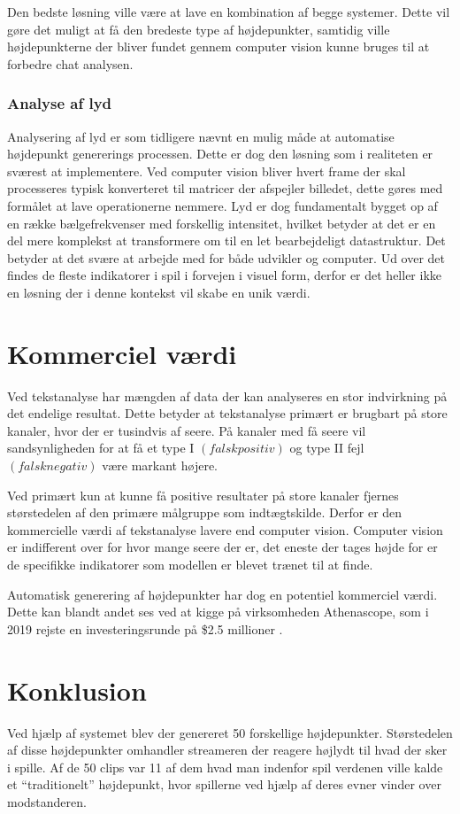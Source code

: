 \documentclass{article}
\begin{document}
Den bedste løsning ville være at lave en kombination af begge systemer. Dette vil gøre det muligt at få den bredeste type af højdepunkter, samtidig ville højdepunkterne der bliver fundet gennem computer vision kunne bruges til at forbedre chat analysen.

\subsubsection{Analyse af lyd }
Analysering af lyd er som tidligere nævnt en mulig måde at automatise højdepunkt genererings processen. Dette er dog den løsning som i realiteten er sværest at implementere. Ved computer vision bliver hvert frame der skal processeres typisk konverteret til matricer der afspejler billedet, dette gøres med formålet at lave operationerne nemmere. Lyd er dog fundamentalt bygget op af en række bælgefrekvenser med forskellig intensitet, hvilket betyder at det er en del mere komplekst at transformere om til en let bearbejdeligt datastruktur. Det betyder at det svære at arbejde med for både udvikler og computer. Ud over det findes de fleste indikatorer i spil i forvejen i visuel form, derfor er det heller ikke en løsning der i denne kontekst vil skabe en unik værdi.


\section{Kommerciel værdi }
Ved tekstanalyse har mængden af data der kan analyseres en stor indvirkning på det endelige resultat. Dette betyder at tekstanalyse primært er brugbart på store kanaler, hvor der er tusindvis af seere. På kanaler med få seere vil sandsynligheden for at få et type I \((falsk positiv)\) og type II fejl \((falsk negativ)\) være markant højere.

Ved primært kun at kunne få positive resultater på store kanaler fjernes størstedelen af den primære målgruppe som indtægtskilde. Derfor er den kommercielle værdi af tekstanalyse lavere end computer vision. Computer vision er indifferent over for hvor mange seere der er, det eneste der tages højde for er de specifikke indikatorer som modellen er blevet trænet til at finde.

Automatisk generering af højdepunkter har dog en potentiel kommerciel værdi. Dette kan blandt andet ses ved at kigge på virksomheden Athenascope, som i 2019 rejste en investeringsrunde på \$2.5 millioner \cite{crunchbase_athenascope_nodate}.

\section{Konklusion}
Ved hjælp af systemet blev der genereret 50 forskellige højdepunkter. Størstedelen af disse højdepunkter omhandler streameren der reagere højlydt til hvad der sker i spille.
Af de 50 clips var 11 af dem hvad man indenfor spil verdenen ville kalde et “traditionelt” højdepunkt, hvor spillerne ved hjælp af deres evner vinder over modstanderen.
\end{document}
